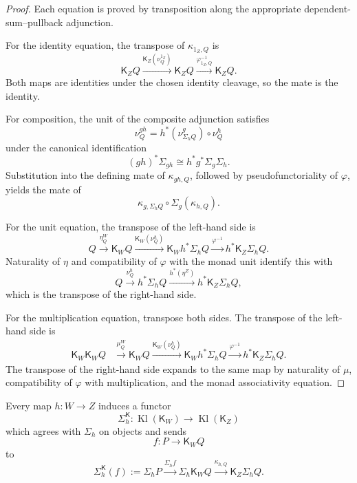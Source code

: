 \begin{proof}
Each equation is proved by transposition along the appropriate
dependent-sum--pullback adjunction.

For the identity equation, the transpose of \(\kappa_{1_Z,Q}\) is
\[
    \mathsf K_ZQ
    \xrightarrow{\mathsf K_Z(\nu^{1_Z}_Q)}
    \mathsf K_ZQ
    \xrightarrow{\varphi^{-1}_{1_Z,Q}}
    \mathsf K_ZQ.
\]
Both maps are identities under the chosen identity cleavage, so the mate is
the identity.

For composition, the unit of the composite adjunction satisfies
\[
    \nu^{gh}_Q
    =
    h^*(\nu^g_{\Sigma_hQ})\circ\nu^h_Q
\]
under the canonical identification
\[
    (gh)^*\Sigma_{gh}
    \cong
    h^*g^*\Sigma_g\Sigma_h.
\]
Substitution into the defining mate of \(\kappa_{gh,Q}\), followed by
pseudofunctoriality of \(\varphi\), yields the mate of
\[
    \kappa_{g,\Sigma_hQ}
    \circ
    \Sigma_g(\kappa_{h,Q}).
\]

For the unit equation, the transpose of the left-hand side is
\[
    Q
    \xrightarrow{\eta^W_Q}
    \mathsf K_WQ
    \xrightarrow{\mathsf K_W(\nu^h_Q)}
    \mathsf K_Wh^*\Sigma_hQ
    \xrightarrow{\varphi^{-1}}
    h^*\mathsf K_Z\Sigma_hQ.
\]
Naturality of \(\eta\) and compatibility of \(\varphi\) with the monad unit
identify this with
\[
    Q
    \xrightarrow{\nu^h_Q}
    h^*\Sigma_hQ
    \xrightarrow{h^*(\eta^Z)}
    h^*\mathsf K_Z\Sigma_hQ,
\]
which is the transpose of the right-hand side.

For the multiplication equation, transpose both sides.  The transpose of
the left-hand side is
\[
\begin{aligned}
    \mathsf K_W\mathsf K_WQ
    &\xrightarrow{\mu^W_Q}
    \mathsf K_WQ
    \xrightarrow{\mathsf K_W(\nu^h_Q)}
    \mathsf K_Wh^*\Sigma_hQ
    \xrightarrow{\varphi^{-1}}
    h^*\mathsf K_Z\Sigma_hQ.
\end{aligned}
\]
The transpose of the right-hand side expands to the same map by naturality
of \(\mu\), compatibility of \(\varphi\) with multiplication, and the monad
associativity equation.
\end{proof}

\begin{corollary}
\label{cor:dependent-sum-kleisli-functor}
Every map \(h:W\to Z\) induces a functor
\[
    \Sigma_h^{\mathsf K}:
    \operatorname{Kl}(\mathsf K_W)
    \longrightarrow
    \operatorname{Kl}(\mathsf K_Z)
\]
which agrees with \(\Sigma_h\) on objects and sends
\[
    f:P\longrightarrow\mathsf K_WQ
\]
to
\[
    \Sigma_h^{\mathsf K}(f)
    :=
    \Sigma_hP
    \xrightarrow{\Sigma_hf}
    \Sigma_h\mathsf K_WQ
    \xrightarrow{\kappa_{h,Q}}
    \mathsf K_Z\Sigma_hQ.
\]
\end{corollary}

